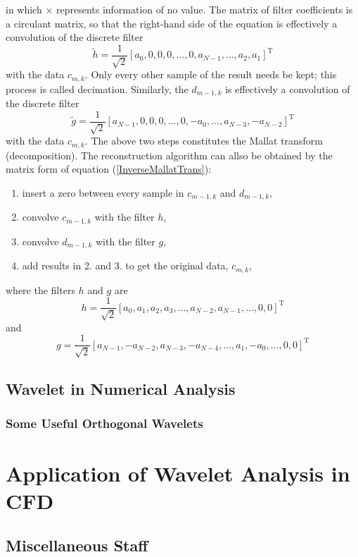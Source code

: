 \documentclass{book}
\newcommand{\Tau}{\mathrm{T}}
\begin{document}
in which $\times$ represents information of no value. The matrix of filter
coefficients is a circulant matrix, so that the right-hand side of the
equation is effectively a convolution of the discrete filter
\[ \tilde{h} = \frac{1}{\sqrt{2}} [a_0, 0, 0, 0, \ldots, 0, a_{N - 1}, \ldots,
   a_2, a_1]^{\Tau} \]
with the data $c_{m, k}$. Only every other sample of the result needs be kept;
this process is called decimation. Similarly, the $d_{m - 1, k}$ is
effectively a convolution of the discrete filter
\[ \tilde{g} = \frac{1}{\sqrt{2}} [a_{N - 1}, 0, 0, 0, \ldots, 0, - a_0,
   \ldots, a_{N - 3}, - a_{N - 2}]^{\Tau} \]
with the data $c_{m, k}$. The above two steps constitutes the Mallat transform
(decomposition). The reconstruction algorithm can allso be obtained by the
matrix form of equation (\ref{InverseMallatTrans}):
\begin{enumerate}
  \item insert a zero between every sample in $c_{m - 1, k}$ and $d_{m - 1,
  k}$,
  
  \item convolve $c_{m - 1, k}$ with the filter $h$,
  
  \item convolve $d_{m - 1, k}$ with the filter $g$,
  
  \item add results in 2. and 3. to get the original data, $c_{m, k}$,
\end{enumerate}
where the filters $h$ and $g$ are
\[ h = \frac{1}{\sqrt{2}} [a_0, a_1, a_2, a_3, \ldots, a_{N - 2}, a_{N - 1},
   \ldots, 0, 0]^{\Tau} \]
and
\[ g = \frac{1}{\sqrt{2}} [a_{N - 1}, - a_{N - 2}, a_{N - 3}, - a_{N - 4},
   \ldots, a_1, - a_0, \ldots, 0, 0]^{\Tau} \]

\chapter{Wavelet in Numerical Analysis}

\section{Some Useful Orthogonal Wavelets}

\part{Application of Wavelet Analysis in CFD}

\chapter{Miscellaneous Staff}
\end{document}
